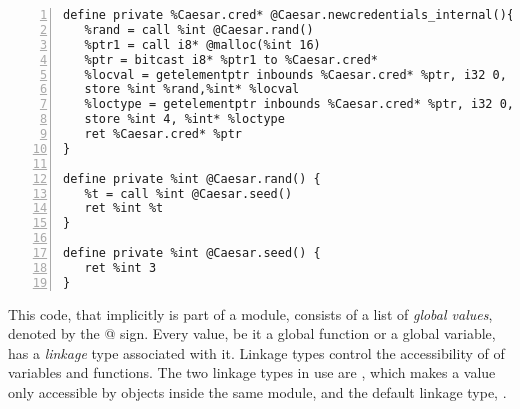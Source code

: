 \begin{lstlisting}[frame=single,numbers=left, language={[x86masm]Assembler}, caption={[LLVM Translation Caesar Cipher Example]LLVM IR for the example.},
label=llvm:Example]
define private %Caesar.cred* @Caesar.newcredentials_internal(){
   %rand = call %int @Caesar.rand()
   %ptr1 = call i8* @malloc(%int 16)
   %ptr = bitcast i8* %ptr1 to %Caesar.cred*
   %locval = getelementptr inbounds %Caesar.cred* %ptr, i32 0, i32 0
   store %int %rand,%int* %locval
   %loctype = getelementptr inbounds %Caesar.cred* %ptr, i32 0, i32 0
   store %int 4, %int* %loctype
   ret %Caesar.cred* %ptr
}

define private %int @Caesar.rand() {
   %t = call %int @Caesar.seed()
   ret %int %t
}

define private %int @Caesar.seed() {
   ret %int 3
}
\end{lstlisting}

This code, that implicitly is part of a module, consists of a list of \emph{global values}, denoted by the @ sign.
Every value, be it a global function or a global variable, has a \emph{linkage} type associated with it.
Linkage types control the accessibility of of variables and functions. The two linkage types in use are , which makes a value only accessible by objects inside the same module, and the default linkage type, .

